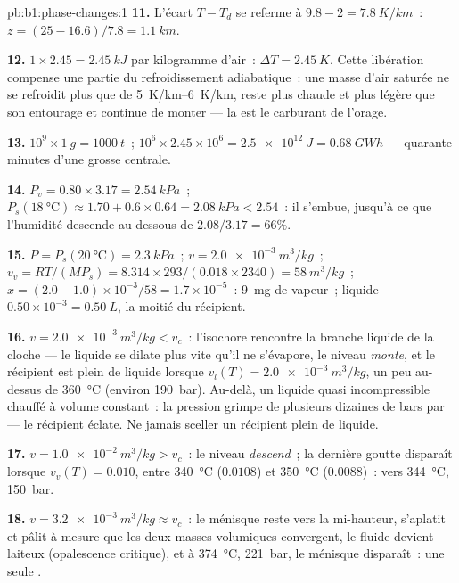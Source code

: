 \begin{solution}{pb:b1:phase-changes:1}
\textbf{11.} L'écart $T - T_d$ se referme à $9.8 - 2 = \qty{7.8}{K/km}$~: $z = (25 - 16.6)/
7.8 = \qty{1.1}{km}$.

\textbf{12.} $1 \times 2.45 = \qty{2.45}{kJ}$ par kilogramme d'air~: $\Delta T =
\qty{2.45}{K}$. Cette libération compense une partie du refroidissement
adiabatique~: une masse d'air saturée ne se refroidit plus que de
\qtyrange{5}{6}{K/km}, reste plus chaude et plus légère que son entourage et
continue de monter --- la  est le carburant de l'orage.

\textbf{13.} $10^9 \times \qty{1}{g} = \qty{1000}{t}$~; $10^6 \times 2.45 \times 10^6 =
\qty{2.5e12}{J} = \qty{0.68}{GW h}$ --- quarante minutes d'une grosse centrale.

\textbf{14.} $P_v = 0.80 \times 3.17 = \qty{2.54}{kPa}$~; $P_s(\qty{18}{\degreeCelsius})
\approx 1.70 + 0.6 \times 0.64 = \qty{2.08}{kPa} < 2.54$~: il s'embue, jusqu'à ce
que l'humidité descende au-dessous de $2.08/3.17 = 66\%$.

\textbf{15.} $P = P_s(\qty{20}{\degreeCelsius}) = \qty{2.3}{kPa}$~; $v = \qty{2.0e-3}{m^3/kg}$~;
$v_v = RT/(MP_s) = 8.314 \times 293/(0.018 \times 2340) = \qty{58}{m^3/kg}$~; $x =
(2.0 - 1.0) \times 10^{-3}/58 = 1.7 \times 10^{-5}$~: \qty{9}{mg} de vapeur~;
liquide $0.50 \times 10^{-3} = \qty{0.50}{L}$, la moitié du récipient.

\textbf{16.} $v = \qty{2.0e-3}{m^3/kg} < v_c$~: l'isochore rencontre la branche
liquide de la cloche --- le liquide se dilate plus vite qu'il ne s'évapore, le
niveau \emph{monte}, et le récipient est plein de liquide lorsque $v_l(T) =
\qty{2.0e-3}{m^3/kg}$, un peu au-dessus de \qty{360}{\degreeCelsius} (environ
\qty{190}{bar}). Au-delà, un liquide quasi incompressible chauffé à volume
constant~: la pression grimpe de plusieurs dizaines de bars par  --- le
récipient éclate. Ne jamais sceller un récipient plein de liquide.

\textbf{17.} $v = \qty{1.0e-2}{m^3/kg} > v_c$~: le niveau \emph{descend}~; la
dernière goutte disparaît lorsque $v_v(T) = 0.010$, entre \qty{340}{\degreeCelsius} ($0.0108$)
et \qty{350}{\degreeCelsius} ($0.0088$)~: vers \qty{344}{\degreeCelsius},
\qty{150}{bar}.

\textbf{18.} $v = \qty{3.2e-3}{m^3/kg} \approx v_c$~: le ménisque reste vers la
mi-hauteur, s'aplatit et pâlit à mesure que les deux masses volumiques
convergent, le fluide devient laiteux (opalescence critique), et à
\qty{374}{\degreeCelsius}, \qty{221}{bar}, le ménisque disparaît~: une seule .


\end{solution}
